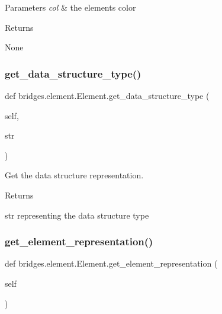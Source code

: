 \begin{DoxyParams}{Parameters}
{\em col} & the element\textquotesingle{}s color \\
\hline
\end{DoxyParams}
\begin{DoxyReturn}{Returns}


None 
\end{DoxyReturn}
\mbox{\label{classbridges_1_1element_1_1_element_a87b8c79123d20eb2af48ae4e4f1bcf32}} 
\subsubsection{\texorpdfstring{get\+\_\+data\+\_\+structure\+\_\+type()}{get\_data\_structure\_type()}}
{\footnotesize\ttfamily def bridges.\+element.\+Element.\+get\+\_\+data\+\_\+structure\+\_\+type (\begin{DoxyParamCaption}\item[{}]{self,  }\item[{}]{str }\end{DoxyParamCaption})}



Get the data structure representation. 

\begin{DoxyReturn}{Returns}


str representing the data structure type 
\end{DoxyReturn}
\mbox{\label{classbridges_1_1element_1_1_element_a511fbc6323616d806ae0ae33010f4654}} 
\subsubsection{\texorpdfstring{get\+\_\+element\+\_\+representation()}{get\_element\_representation()}}
{\footnotesize\ttfamily def bridges.\+element.\+Element.\+get\+\_\+element\+\_\+representation (\begin{DoxyParamCaption}\item[{}]{self }\end{DoxyParamCaption})}



